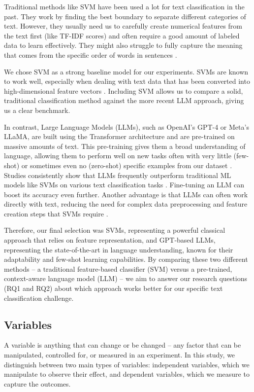 Traditional methods like SVM have been used a lot for text classification in the past. They work by finding the best boundary to separate different categories of text. However, they usually need us to carefully create numerical features from the text first (like TF-IDF scores) and often require a good amount of labeled data to learn effectively. They might also struggle to fully capture the meaning that comes from the specific order of words in sentences \cite{sarker2021machine}.

We chose SVM as a strong baseline model for our experiments. SVMs are known to work well, especially when dealing with text data that has been converted into high-dimensional feature vectors \cite{Joachims1998}. Including SVM allows us to compare a solid, traditional classification method against the more recent LLM approach, giving us a clear benchmark.

In contrast, Large Language Models (LLMs), such as OpenAI's GPT-4 or Meta's LLaMA, are built using the Transformer architecture and are pre-trained on massive amounts of text. This pre-training gives them a broad understanding of language, allowing them to perform well on new tasks often with very little (few-shot) or sometimes even no (zero-shot) specific examples from our dataset \cite{brown2020language, touvron2023llama}. Studies consistently show that LLMs frequently outperform traditional ML models like SVMs on various text classification tasks \cite{moller2024parrot, betianu2024dallmi}. Fine-tuning an LLM can boost its accuracy even further. Another advantage is that LLMs can often work directly with text, reducing the need for complex data preprocessing and feature creation steps that SVMs require \cite{oh2024language}.

Therefore, our final selection was SVMs, representing a powerful classical approach that relies on feature representation, and GPT-based LLMs, representing the state-of-the-art in language understanding, known for their adaptability and few-shot learning capabilities. By comparing these two different methods -- a traditional feature-based classifier (SVM) versus a pre-trained, context-aware language model (LLM) -- we aim to answer our research questions (RQ1 and RQ2) about which approach works better for our specific text classification challenge.

\subsection{Variables}
A variable is anything that can change or be changed -- any factor that can be manipulated, controlled for, or measured in an experiment. In this study, we distinguish between two main types of variables: independent variables, which we manipulate to observe their effect, and dependent variables, which we measure to capture the outcomes.

